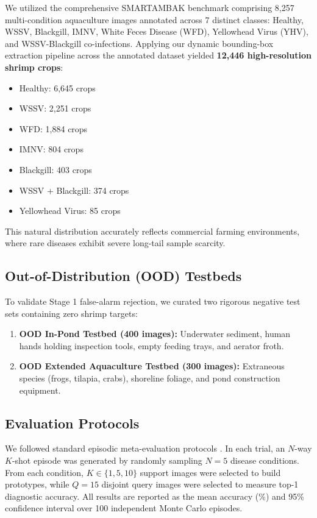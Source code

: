 \documentclass[conference]{IEEEtran}
\begin{document}
We utilized the comprehensive SMARTAMBAK benchmark comprising 8,257 multi-condition aquaculture images annotated across 7 distinct classes: Healthy, WSSV, Blackgill, IMNV, White Feces Disease (WFD), Yellowhead Virus (YHV), and WSSV-Blackgill co-infections. Applying our dynamic bounding-box extraction pipeline across the annotated dataset yielded \textbf{12,446 high-resolution shrimp crops}:
\begin{itemize}
    \item Healthy: 6,645 crops
    \item WSSV: 2,251 crops
    \item WFD: 1,884 crops
    \item IMNV: 804 crops
    \item Blackgill: 403 crops
    \item WSSV + Blackgill: 374 crops
    \item Yellowhead Virus: 85 crops
\end{itemize}
This natural distribution accurately reflects commercial farming environments, where rare diseases exhibit severe long-tail sample scarcity.

\subsection{Out-of-Distribution (OOD) Testbeds}
To validate Stage 1 false-alarm rejection, we curated two rigorous negative test sets containing zero shrimp targets:
\begin{enumerate}
    \item \textbf{OOD In-Pond Testbed (400 images):} Underwater sediment, human hands holding inspection tools, empty feeding trays, and aerator froth.
    \item \textbf{OOD Extended Aquaculture Testbed (300 images):} Extraneous species (frogs, tilapia, crabs), shoreline foliage, and pond construction equipment.
\end{enumerate}

\subsection{Evaluation Protocols}
We followed standard episodic meta-evaluation protocols \cite{vinyals2016matching, snell2017prototypical}. In each trial, an $N$-way $K$-shot episode was generated by randomly sampling $N=5$ disease conditions. From each condition, $K \in \{1, 5, 10\}$ support images were selected to build prototypes, while $Q = 15$ disjoint query images were selected to measure top-1 diagnostic accuracy. All results are reported as the mean accuracy (\%) and 95\% confidence interval over 100 independent Monte Carlo episodes.
\end{document}
